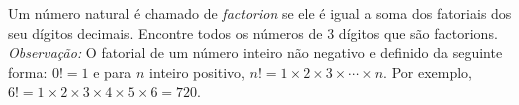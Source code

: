 Um número natural é chamado de \textit{factorion} se ele é igual a soma dos fatoriais dos seu dígitos decimais.
Encontre todos os números de 3 dígitos que são factorions.
\textit{Observação:} O fatorial de um número inteiro não negativo e definido da seguinte forma:
$0! = 1$ e para $n$ inteiro positivo, $n! = 1 \times 2 \times 3 \times \cdots \times n$. Por exemplo, $6! = 1 \times 2 \times 3 \times 4 \times 5 \times 6 = 720$.